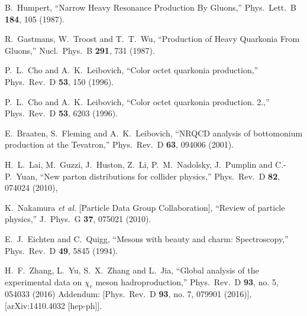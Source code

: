 \documentclass[aps,prc,preprint,superscriptaddress,showpacs,showkeys,amsmath]{revtex4-1}
\begin{document}
\begin{thebibliography}{100}
  B.~Humpert,
  ``Narrow Heavy Resonance Production By Gluons,''
  Phys.\ Lett.\ B {\bf 184}, 105 (1987).


  R.~Gastmans, W.~Troost and T.~T.~Wu,
  ``Production of Heavy Quarkonia From Gluons,''
  Nucl.\ Phys.\ B {\bf 291}, 731 (1987).


  P.~L.~Cho and A.~K.~Leibovich,
  ``Color octet quarkonia production,''
  Phys.\ Rev.\ D {\bf 53}, 150 (1996).


  P.~L.~Cho and A.~K.~Leibovich,
  ``Color octet quarkonia production. 2.,''
  Phys.\ Rev.\ D {\bf 53}, 6203 (1996).


  E.~Braaten, S.~Fleming and A.~K.~Leibovich,
  ``NRQCD analysis of bottomonium production at the Tevatron,''
  Phys.\ Rev.\ D {\bf 63}, 094006 (2001).


  H.~L.~Lai, M.~Guzzi, J.~Huston, Z.~Li, P.~M.~Nadolsky, J.~Pumplin and C.-P.~Yuan,
  ``New parton distributions for collider physics,''
  Phys.\ Rev.\ D {\bf 82}, 074024 (2010),


  K.~Nakamura {\it et al.}  [Particle Data Group Collaboration],
  ``Review of particle physics,''
  J.\ Phys.\ G {\bf 37}, 075021 (2010).


  E.~J.~Eichten and C.~Quigg,
  ``Mesons with beauty and charm: Spectroscopy,''
  Phys.\ Rev.\ D {\bf 49}, 5845 (1994).



  H.~F.~Zhang, L.~Yu, S.~X.~Zhang and L.~Jia,
  ``Global analysis of the experimental data on $\chi_c$ meson hadroproduction,''
  Phys.\ Rev.\ D {\bf 93}, no. 5, 054033 (2016) Addendum: [Phys.\ Rev.\ D {\bf 93}, no. 7, 079901 (2016)], 
  [arXiv:1410.4032 [hep-ph]].












 
 


\end{thebibliography}
\end{document}

